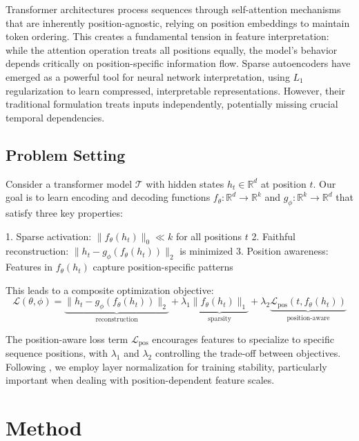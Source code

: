 \documentclass{article} %
\begin{document}
Transformer architectures \cite{vaswani2017attention} process sequences through self-attention mechanisms that are inherently position-agnostic, relying on position embeddings to maintain token ordering. This creates a fundamental tension in feature interpretation: while the attention operation treats all positions equally, the model's behavior depends critically on position-specific information flow. Sparse autoencoders \cite{goodfellow2016deep} have emerged as a powerful tool for neural network interpretation, using $L_1$ regularization to learn compressed, interpretable representations. However, their traditional formulation treats inputs independently, potentially missing crucial temporal dependencies.

\subsection{Problem Setting}
Consider a transformer model $\mathcal{T}$ with hidden states $h_t \in \mathbb{R}^d$ at position $t$. Our goal is to learn encoding and decoding functions $f_\theta: \mathbb{R}^d \to \mathbb{R}^k$ and $g_\phi: \mathbb{R}^k \to \mathbb{R}^d$ that satisfy three key properties:

1. Sparse activation: $\|f_\theta(h_t)\|_0 \ll k$ for all positions $t$
2. Faithful reconstruction: $\|h_t - g_\phi(f_\theta(h_t))\|_2$ is minimized
3. Position awareness: Features in $f_\theta(h_t)$ capture position-specific patterns

This leads to a composite optimization objective:
\begin{equation}
    \mathcal{L}(\theta, \phi) = \underbrace{\|h_t - g_\phi(f_\theta(h_t))\|_2}_{\text{reconstruction}} + \lambda_1 \underbrace{\|f_\theta(h_t)\|_1}_{\text{sparsity}} + \lambda_2 \underbrace{\mathcal{L}_\text{pos}(t, f_\theta(h_t))}_{\text{position-aware}}
\end{equation}

The position-aware loss term $\mathcal{L}_\text{pos}$ encourages features to specialize to specific sequence positions, with $\lambda_1$ and $\lambda_2$ controlling the trade-off between objectives. Following \cite{ba2016layer}, we employ layer normalization for training stability, particularly important when dealing with position-dependent feature scales.

\section{Method}
\label{sec:method}
\end{document}
